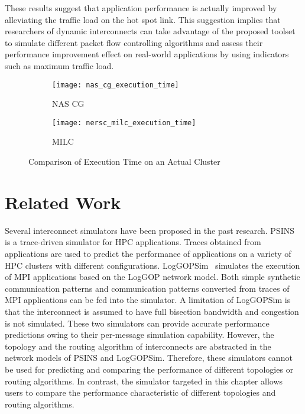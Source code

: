 These results suggest that application performance is actually improved
by alleviating the traffic load on the hot spot link. This suggestion
implies that researchers of dynamic interconnects can take advantage of
the proposed toolset to simulate different packet flow controlling algorithms
and assess their performance improvement effect on real-world applications by
using indicators such as maximum traffic load.

\begin{figure}
    \begin{subfigure}{.47\linewidth}
        \centering
        \texttt{[image: nas\_cg\_execution\_time]}
        \caption{NAS CG}%
        \label{fig:nas-cg-time}
    \end{subfigure}%
    \begin{subfigure}{.47\linewidth}
        \centering
        \texttt{[image: nersc\_milc\_execution\_time]}
        \caption{MILC}%
        \label{fig:nersc-milc-time}
    \end{subfigure}
    \caption{Comparison of Execution Time on an Actual Cluster}%
    \label{fig:single-job-time}
\end{figure}

\section{Related Work}\label{sec:ii-related-work}

Several interconnect simulators have been proposed in the past research.
PSINS~\autocite{Tikir2009} is a trace-driven simulator for HPC
applications. Traces obtained from applications are used to predict the
performance of applications on a variety of HPC clusters with different
configurations. LogGOPSim~\autocite{Hoefler2010} simulates the execution
of MPI applications based on the LogGOP network model. Both simple
synthetic communication patterns and communication patterns converted
from traces of MPI applications can be fed into the simulator. A
limitation of LogGOPSim is that the interconnect is assumed to have full
bisection bandwidth and congestion is not simulated. These two
simulators can provide accurate performance predictions owing to their
per-message simulation capability. However, the topology and the routing
algorithm of interconnects are abstracted in the network models of PSINS
and LogGOPSim. Therefore, these simulators cannot be used for predicting
and comparing the performance of different topologies or routing
algorithms. In contrast, the simulator targeted in this chapter allows
users to compare the performance characteristic of different topologies
and routing algorithms.

